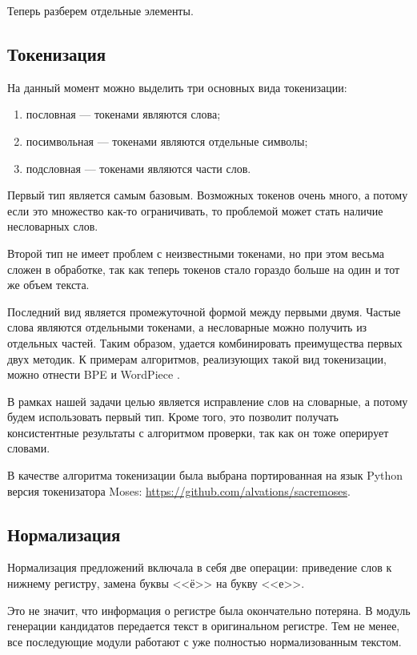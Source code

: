 Теперь разберем отдельные элементы.

\subsection{Токенизация}

На данный момент можно выделить три основных вида токенизации:
\begin{enumerate}
	\item пословная --- токенами являются слова;
	\item посимвольная --- токенами являются отдельные символы;
	\item подсловная --- токенами являются части слов.
\end{enumerate}

Первый тип является самым базовым. Возможных токенов очень много, а потому если это множество как-то ограничивать, то проблемой может стать наличие несловарных слов.

Второй тип не имеет проблем с неизвестными токенами, но при этом весьма сложен в обработке, так как теперь токенов стало гораздо больше на один и тот же объем текста.

Последний вид является промежуточной формой между первыми двумя. Частые слова являются отдельными токенами, а несловарные можно получить из отдельных частей. Таким образом, удается комбинировать преимущества первых двух методик. К примерам алгоритмов, реализующих такой вид токенизации, можно отнести BPE \cite{Gage1994} и WordPiece \cite{Devlin2019}.

В рамках нашей задачи целью является исправление слов на словарные, а потому будем использовать первый тип. Кроме того, это позволит получать консистентные результаты с алгоритмом проверки, так как он тоже оперирует словами.

В качестве алгоритма токенизации была выбрана портированная на язык Python версия токенизатора Moses: \url{https://github.com/alvations/sacremoses}.

\subsection{Нормализация}

Нормализация предложений включала в себя две операции: приведение слов к нижнему регистру, замена буквы <<ё>> на букву <<е>>.

Это не значит, что информация о регистре была окончательно потеряна. В модуль генерации кандидатов передается текст в оригинальном регистре. Тем не менее, все последующие модули работают с уже полностью нормализованным текстом.

